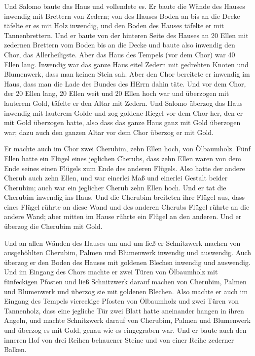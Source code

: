  Und Salomo baute das Haus und vollendete es. 
Er baute die Wände des Hauses inwendig mit Brettern von Zedern; von des
Hauses Boden an bis an die Decke täfelte er es mit Holz inwendig, und
den Boden des Hauses täfelte er mit Tannenbrettern.  Und er
baute von der hinteren Seite des Hauses an 20 Ellen mit zedernen
Brettern vom Boden bis an die Decke und baute also inwendig den Chor,
das Allerheiligste.  Aber das Haus des Tempels (vor dem
Chor) war 40 Ellen lang.  Inwendig war das ganze Haus eitel
Zedern mit gedrehten Knoten und Blumenwerk, dass man keinen Stein sah.
 Aber den Chor bereitete er inwendig im Haus, dass man die
Lade des Bundes des HErrn dahin täte.  Und vor dem Chor,
der 20 Ellen lang, 20 Ellen weit und 20 Ellen hoch war und überzogen mit
lauterem Gold, täfelte er den Altar mit Zedern.  Und Salomo
überzog das Haus inwendig mit lauterem Golde und zog goldene Riegel vor
dem Chor her, den er mit Gold überzogen hatte,  also dass
das ganze Haus ganz mit Gold überzogen war; dazu auch den ganzen Altar
vor dem Chor überzog er mit Gold.

 Er machte auch im Chor zwei Cherubim, zehn Ellen hoch, von
Ölbaumholz.  Fünf Ellen hatte ein Flügel eines jeglichen
Cherubs, dass zehn Ellen waren von dem Ende seines einen Flügels zum
Ende des anderen Flügels.  Also hatte der andere Cherub
auch zehn Ellen, und war einerlei Maß und einerlei Gestalt beider
Cherubim;  auch war ein jeglicher Cherub zehn Ellen hoch.
 Und er tat die Cherubim inwendig ins Haus. Und die
Cherubim breiteten ihre Flügel aus, dass eines Flügel rührte an diese
Wand und des anderen Cherubs Flügel rührte an die andere Wand; aber
mitten im Hause rührte ein Flügel an den anderen.  Und er
überzog die Cherubim mit Gold.

 Und an allen Wänden des Hauses um und um ließ er
Schnitzwerk machen von ausgehöhlten Cherubim, Palmen und Blumenwerk
inwendig und auswendig.  Auch überzog er den Boden des
Hauses mit goldenen Blechen inwendig und auswendig.  Und im
Eingang des Chors machte er zwei Türen von Ölbaumholz mit fünfeckigen
Pfosten  und ließ Schnitzwerk darauf machen von Cherubim,
Palmen und Blumenwerk und überzog sie mit goldenen Blechen.
 Also machte er auch im Eingang des Tempels viereckige
Pfosten von Ölbaumholz  und zwei Türen von Tannenholz, dass
eine jegliche Tür zwei Blatt hatte aneinander hangen in ihren Angeln,
 und machte Schnitzwerk darauf von Cherubim, Palmen und
Blumenwerk und überzog es mit Gold, genau wie es eingegraben war.
 Und er baute auch den inneren Hof von drei Reihen
behauener Steine und von einer Reihe zederner Balken.

